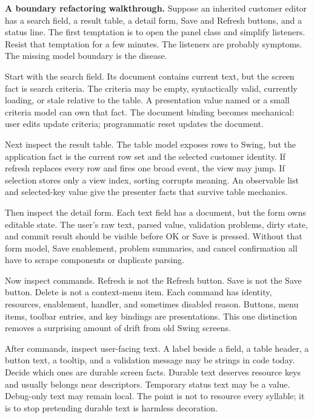 \textbf{A boundary refactoring walkthrough.} Suppose an inherited customer editor has a search field, a result table, a detail form, Save and Refresh buttons, and a status line. The first temptation is to open the panel class and simplify listeners. Resist that temptation for a few minutes. The listeners are probably symptoms. The missing model boundary is the disease.

Start with the search field. Its document contains current text, but the screen fact is search criteria. The criteria may be empty, syntactically valid, currently loading, or stale relative to the table. A presentation value named  or a small criteria model can own that fact. The document binding becomes mechanical: user edits update criteria; programmatic reset updates the document.

Next inspect the result table. The table model exposes rows to Swing, but the application fact is the current row set and the selected customer identity. If refresh replaces every row and fires one broad event, the view may jump. If selection stores only a view index, sorting corrupts meaning. An observable list and selected-key value give the presenter facts that survive table mechanics.

Then inspect the detail form. Each text field has a document, but the form owns editable state. The user's raw text, parsed value, validation problems, dirty state, and commit result should be visible before OK or Save is pressed. Without that form model, Save enablement, problem summaries, and cancel confirmation all have to scrape components or duplicate parsing.

Now inspect commands. Refresh is not the Refresh button. Save is not the Save button. Delete is not a context-menu item. Each command has identity, resources, enablement, handler, and sometimes disabled reason. Buttons, menu items, toolbar entries, and key bindings are presentations. This one distinction removes a surprising amount of drift from old Swing screens.

After commands, inspect user-facing text. A label beside a field, a table header, a button text, a tooltip, and a validation message may be strings in code today. Decide which ones are durable screen facts. Durable text deserves resource keys and usually belongs near descriptors. Temporary status text may be a value. Debug-only text may remain local. The point is not to resource every syllable; it is to stop pretending durable text is harmless decoration.

